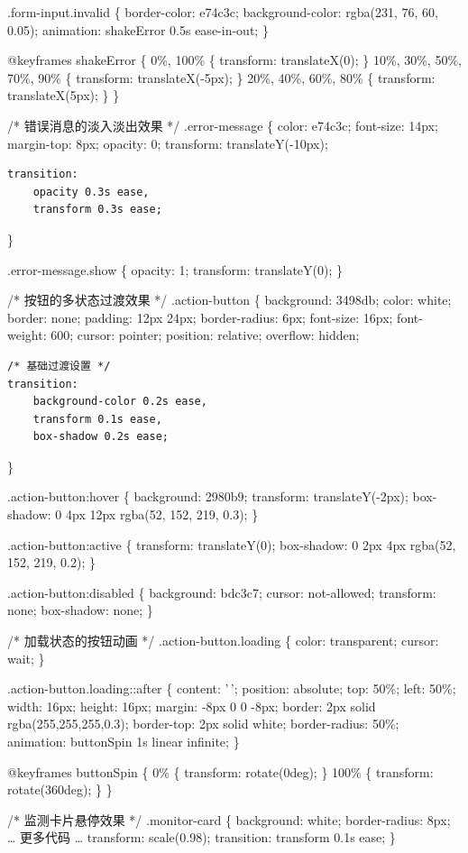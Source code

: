 .form-input.invalid \{ border-color: e74c3c; background-color: rgba(231, 76, 60, 0.05); animation: shakeError 0.5s ease-in-out; \}

@keyframes shakeError \{ 0\%, 100\% \{ transform: translateX(0); \} 10\%, 30\%, 50\%, 70\%, 90\% \{ transform: translateX(-5px); \} 20\%, 40\%, 60\%, 80\% \{ transform: translateX(5px); \} \}

/* 错误消息的淡入淡出效果 */ .error-message \{ color: e74c3c; font-size: 14px; margin-top: 8px; opacity: 0; transform: translateY(-10px);

\begin{verbatim}
transition: 
    opacity 0.3s ease,
    transform 0.3s ease;
\end{verbatim}

\}

.error-message.show \{ opacity: 1; transform: translateY(0); \}

/* 按钮的多状态过渡效果 */ .action-button \{ background: 3498db; color: white; border: none; padding: 12px 24px; border-radius: 6px; font-size: 16px; font-weight: 600; cursor: pointer; position: relative; overflow: hidden;

\begin{verbatim}
/* 基础过渡设置 */
transition: 
    background-color 0.2s ease,
    transform 0.1s ease,
    box-shadow 0.2s ease;
\end{verbatim}

\}

.action-button:hover \{ background: 2980b9; transform: translateY(-2px); box-shadow: 0 4px 12px rgba(52, 152, 219, 0.3); \}

.action-button:active \{ transform: translateY(0); box-shadow: 0 2px 4px rgba(52, 152, 219, 0.2); \}

.action-button:disabled \{ background: bdc3c7; cursor: not-allowed; transform: none; box-shadow: none; \}

/* 加载状态的按钮动画 */ .action-button.loading \{ color: transparent; cursor: wait; \}

.action-button.loading::after \{ content: '\,'; position: absolute; top: 50\%; left: 50\%; width: 16px; height: 16px; margin: -8px 0 0 -8px; border: 2px solid rgba(255,255,255,0.3); border-top: 2px solid white; border-radius: 50\%; animation: buttonSpin 1s linear infinite; \}

@keyframes buttonSpin \{ 0\% \{ transform: rotate(0deg); \} 100\% \{ transform: rotate(360deg); \} \}

/* 监测卡片悬停效果 */ .monitor-card \{ background: white; border-radius: 8px;  \ldots{} 更多代码 \ldots{} transform: scale(0.98); transition: transform 0.1s ease; \}

